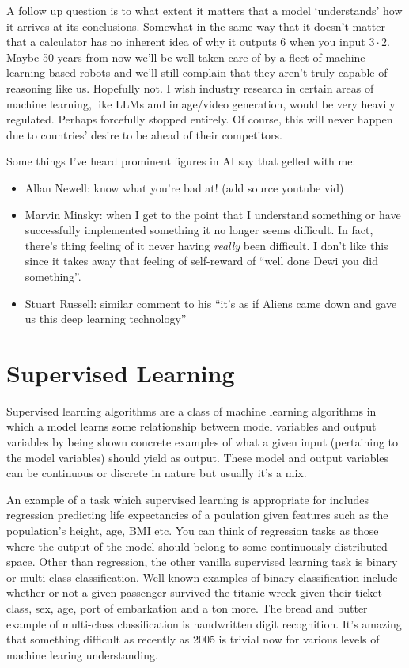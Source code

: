 \documentclass[11pt]{article}
\begin{document}
A follow up question is to what extent it matters that a model `understands' how it arrives at its conclusions. Somewhat in the same way that it doesn't matter that a calculator has no inherent idea of why it outputs 6 when you input $3\cdot2$. Maybe 50 years from now we'll be well-taken care of by a fleet of machine learning-based robots and we'll still complain that they aren't truly capable of reasoning like us. Hopefully not. I wish industry research in certain areas of machine learning, like LLMs and image/video generation, would be very heavily regulated. Perhaps forcefully stopped entirely. Of course, this will never happen due to countries' desire to be ahead of their competitors.

Some things I've heard prominent figures in AI say that gelled with me:
\begin{itemize}
    \item Allan Newell: know what you're bad at! (add source youtube vid)
    \item Marvin Minsky: when I get to the point that I understand something or have successfully implemented something it no longer seems difficult. In fact, there's thing feeling of it never having \textit{really} been difficult. I don't like this since it takes away that feeling of self-reward of ``well done Dewi you did something''.
    \item Stuart Russell: similar comment to his ``it's as if Aliens came down and gave us this deep learning technology''
\end{itemize}

\section{Supervised Learning}

Supervised learning algorithms are a class of machine learning algorithms in which a model learns some relationship between model variables and output variables by being shown concrete examples of what a given input (pertaining to the model variables) should yield as output. These model and output variables can be continuous or discrete in nature but usually it's a mix.

An example of a task which supervised learning is appropriate for includes regression predicting life expectancies of a poulation given features such as the population's height, age, BMI etc. You can think of regression tasks as those where the output of the model should belong to some continuously distributed space. Other than regression, the other vanilla supervised learning task is binary or multi-class classification. Well known examples of binary classification include whether or not a given passenger survived the titanic wreck given their ticket class, sex, age, port of embarkation and a ton more. The bread and butter example of multi-class classification is handwritten digit recognition. It's amazing that something difficult as recently as 2005 is trivial now for various levels of machine learing understanding.
\end{document}
